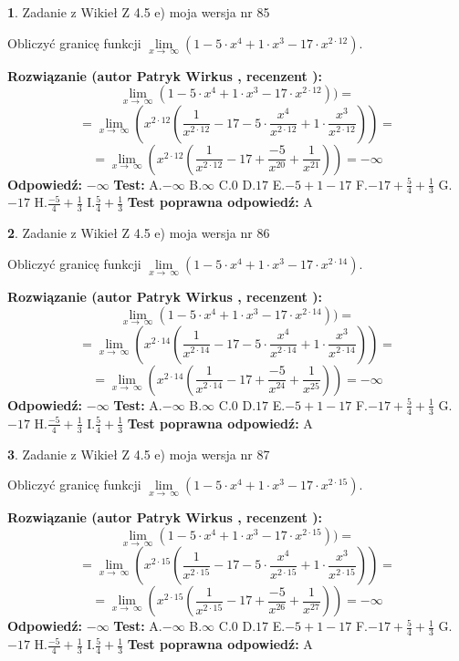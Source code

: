 \documentclass[12pt, a4paper]{article}
\theoremstyle{definition} %
\newtheorem{zad}{}
\newcommand{\zadStart}[1]{\begin{zad}#1\newline}
\newcommand{\zadStop}{\end{zad}}
\newcommand{\rozwStart}[2]{\noindent \textbf{Rozwiązanie (autor #1 , recenzent #2): }\newline}
\newcommand{\rozwStop}{\newline}
\newcommand{\odpStart}{\noindent \textbf{Odpowiedź:}\newline}
\newcommand{\odpStop}{\newline}
\newcommand{\testStart}{\noindent \textbf{Test:}\newline}
\newcommand{\testStop}{\newline}
\newcommand{\kluczStart}{\noindent \textbf{Test poprawna odpowiedź:}\newline}
\newcommand{\kluczStop}{\newline}
\begin{document}
\zadStart{Zadanie z Wikieł Z 4.5 e) moja wersja nr 85}



Obliczyć granicę funkcji  $\lim\limits_{x\to\ \infty}(1 - 5 \cdot x^{4}+1 \cdot x^{3}- 17 \cdot x^{2\cdot12})$.
\zadStop
\rozwStart{Patryk Wirkus}{}
$$\lim\limits_{x\to\ \infty}(1 - 5 \cdot x^{4}+1 \cdot x^{3}- 17 \cdot x^{2\cdot12}))=$$
$$=\lim\limits_{x\to\ \infty}(x^{2\cdot12}(\frac{1}{x^{2\cdot12}}-17 -5 \cdot \frac{x^{4}}{x^{2\cdot12}}+1 \cdot \frac{x^{3}}{x^{2\cdot12}}))=$$
$$=\lim\limits_{x\to\ \infty}(x^{2\cdot12}(\frac{1}{x^{2\cdot12}}-17 + \frac{-5}{x^{20}}+ \frac{1}{x^{21}}))=-\infty$$
\rozwStop
\odpStart
$-\infty$
\odpStop
\testStart
A.$-\infty$ B.$\infty$ C.$0$ D.$17$ E.$-5 + 1 - 17$
F.$-17+\frac{5}{4}+\frac{1}{3}$ G.$-17$
H.$\frac{-5}{4}+\frac{1}{3}$
I.$\frac{5}{4}+\frac{1}{3}$
\testStop
\kluczStart
A
\kluczStop



\zadStart{Zadanie z Wikieł Z 4.5 e) moja wersja nr 86}



Obliczyć granicę funkcji  $\lim\limits_{x\to\ \infty}(1 - 5 \cdot x^{4}+1 \cdot x^{3}- 17 \cdot x^{2\cdot14})$.
\zadStop
\rozwStart{Patryk Wirkus}{}
$$\lim\limits_{x\to\ \infty}(1 - 5 \cdot x^{4}+1 \cdot x^{3}- 17 \cdot x^{2\cdot14}))=$$
$$=\lim\limits_{x\to\ \infty}(x^{2\cdot14}(\frac{1}{x^{2\cdot14}}-17 -5 \cdot \frac{x^{4}}{x^{2\cdot14}}+1 \cdot \frac{x^{3}}{x^{2\cdot14}}))=$$
$$=\lim\limits_{x\to\ \infty}(x^{2\cdot14}(\frac{1}{x^{2\cdot14}}-17 + \frac{-5}{x^{24}}+ \frac{1}{x^{25}}))=-\infty$$
\rozwStop
\odpStart
$-\infty$
\odpStop
\testStart
A.$-\infty$ B.$\infty$ C.$0$ D.$17$ E.$-5 + 1 - 17$
F.$-17+\frac{5}{4}+\frac{1}{3}$ G.$-17$
H.$\frac{-5}{4}+\frac{1}{3}$
I.$\frac{5}{4}+\frac{1}{3}$
\testStop
\kluczStart
A
\kluczStop



\zadStart{Zadanie z Wikieł Z 4.5 e) moja wersja nr 87}



Obliczyć granicę funkcji  $\lim\limits_{x\to\ \infty}(1 - 5 \cdot x^{4}+1 \cdot x^{3}- 17 \cdot x^{2\cdot15})$.
\zadStop
\rozwStart{Patryk Wirkus}{}
$$\lim\limits_{x\to\ \infty}(1 - 5 \cdot x^{4}+1 \cdot x^{3}- 17 \cdot x^{2\cdot15}))=$$
$$=\lim\limits_{x\to\ \infty}(x^{2\cdot15}(\frac{1}{x^{2\cdot15}}-17 -5 \cdot \frac{x^{4}}{x^{2\cdot15}}+1 \cdot \frac{x^{3}}{x^{2\cdot15}}))=$$
$$=\lim\limits_{x\to\ \infty}(x^{2\cdot15}(\frac{1}{x^{2\cdot15}}-17 + \frac{-5}{x^{26}}+ \frac{1}{x^{27}}))=-\infty$$
\rozwStop
\odpStart
$-\infty$
\odpStop
\testStart
A.$-\infty$ B.$\infty$ C.$0$ D.$17$ E.$-5 + 1 - 17$
F.$-17+\frac{5}{4}+\frac{1}{3}$ G.$-17$
H.$\frac{-5}{4}+\frac{1}{3}$
I.$\frac{5}{4}+\frac{1}{3}$
\testStop
\kluczStart
A
\kluczStop
\end{document}
